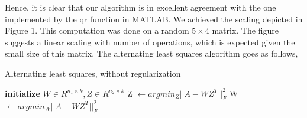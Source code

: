 \documentclass{article}
\begin{document}
 Hence, it is clear that our algorithm is in excellent agreement with the one implemented by the qr function in MATLAB. 
We achieved the scaling depicted in Figure 1. This computation was done on a random $5 \times 4$ matrix. The figure suggests a linear scaling with number of operations, which is expected given the small size of this matrix. 
The alternating least squares algorithm goes as follows,  
\begin{algorithm}
\caption{Alternating least squares, without regularization}
\label{alg:als}
\begin{algorithmic}[2]
\State \textbf{initialize} $W \in R^{n_{1} \times k}, Z \in R^{n_{2} \times k}$
\State Z $\leftarrow argmin_{Z} ||A-WZ^{T}||_{F}^{2}$ 
\State W $\leftarrow argmin_{W} ||A-WZ^{T}||_{F}^{2}$ 
\end{algorithmic} 
\end{algorithm}
\end{document}
